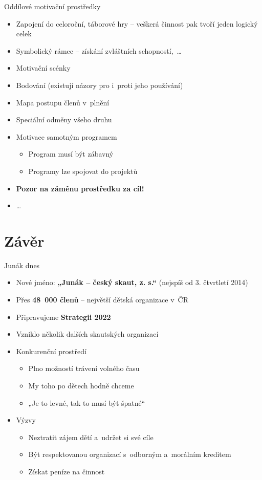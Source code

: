 \documentclass[compress,xelatex,xcolor=dvipsnames,print]{beamer}
\begin{document}
\begin{frame}{Oddílové motivační prostředky}
\begin{itemize}
\item Zapojení do celoroční, táborové hry -- veškerá činnost pak tvoří jeden logický celek
\item Symbolický rámec -- získání zvláštních schopností,~\ldots
\item Motivační scénky
\item Bodování (existují názory pro i~proti jeho používání)
\item Mapa postupu členů v~plnění
\item Speciální odměny všeho druhu
\item Motivace samotným programem
 \begin{itemize}
 \item Program musí být zábavný
 \item Programy lze spojovat do projektů
 \end{itemize}
\item \textbf{Pozor na záměnu prostředku za cíl!}
\item \ldots
\end{itemize}
\end{frame}

\section{Závěr}

\begin{frame}{Junák dnes}
\begin{itemize}
 \item Nové jméno: \textbf{„Junák – český skaut, z. s.“} (nejspíš od 3. čtvrtletí 2014)
 \item Přes \textbf{48~000 členů} -- největší dětská organizace v~ČR
 \item Připravujeme \textbf{Strategii 2022}
 \item Vzniklo několik dalších skautských organizací
 \item Konkurenční prostředí
 \begin{itemize}
  \item Plno možností trávení volného času
  \item My toho po dětech hodně chceme
  \item „Je to levné, tak to musí být špatné“
 \end{itemize}
 \item Výzvy
 \begin{itemize}
  \item Neztratit zájem dětí a~udržet si své cíle
  \item Být respektovanou organizací s~odborným a~morálním kreditem
  \item Získat peníze na činnost
 \end{itemize}
\end{itemize}
\end{frame}
\end{document}
